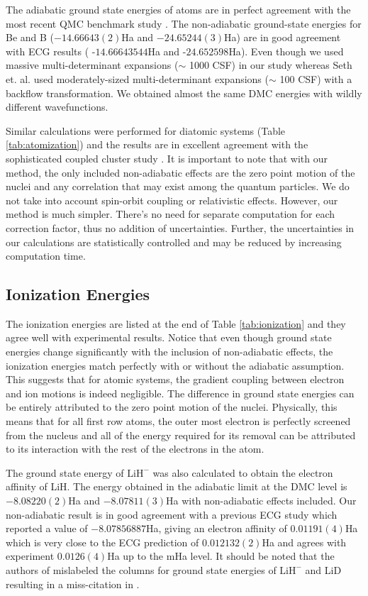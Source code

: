 \documentclass[aps,prl,superscriptaddress,groupedaddress]{revtex4}
\begin{document}
The adiabatic ground state energies of atoms are in perfect agreement with the most recent QMC benchmark study \cite{Seth_Bench}. The non-adiabatic ground-state energies for Be and B ($-14.66643(2)$Ha and $-24.65244(3)$Ha) are in good agreement with ECG results ( -$14.66643544$Ha \cite{Bubin_BeH_noBO} and -$24.652598$Ha\cite{Bubin_BH_noBO}). Even though we used massive multi-determinant expansions ($\sim$ 1000 CSF) in our study whereas Seth et. al. \cite{Seth_Bench} used moderately-sized multi-determinant expansions ($\sim$ 100 CSF) with a backflow transformation. We obtained almost the same DMC energies with wildly different wavefunctions.

Similar calculations were performed for diatomic systems (Table \ref{tab:atomization}) and the results are in excellent agreement with the sophisticated coupled cluster study \cite{Feller_Corrections}. It is important to note that with our method, the only included non-adiabatic effects are the zero point motion of the nuclei and any correlation that may exist among the quantum particles. We do not take into account spin-orbit coupling or relativistic effects. However, our method is much simpler. There's no need for separate computation for each correction factor, thus no addition of uncertainties. Further, the uncertainties in our calculations are statistically controlled and may be reduced by increasing computation time. 

\subsection{Ionization Energies}
The ionization energies are listed at the end of Table \ref{tab:ionization} and they agree well with experimental results. Notice that even though ground state energies change significantly with the inclusion of non-adiabatic effects, the ionization energies match perfectly with or without the adiabatic assumption. This suggests that for atomic systems, the gradient coupling between electron and ion motions is indeed negligible. The difference in ground state energies can be entirely attributed to the zero point motion of the nuclei. Physically, this means that for all first row atoms, the outer most electron is perfectly screened from the nucleus and all of the energy required for its removal can be attributed to its interaction with the rest of the electrons in the atom.

The ground state energy of $\text{LiH}^-$ was also calculated to obtain the electron affinity of LiH. The energy obtained in the adiabatic limit at the DMC level is $-8.08220(2)$Ha and $-8.07811(3)$Ha with non-adiabatic effects included. Our non-adiabatic result is in good agreement with a previous ECG study \cite{Bubin_LiH_noBO} which reported a value of $-8.07856887$Ha, giving an electron affinity of $0.01191(4)$Ha which is very close to the ECG prediction of $0.012132(2)$Ha and agrees with experiment $0.0126(4)$Ha up to the mHa level.  It should be noted that the authors of \cite{Bubin_LiH_noBO} mislabeled the columns for ground state energies of $\text{LiH}^-$ and LiD resulting in a miss-citation in \cite{Mitroy_ECG}.
\end{document}
